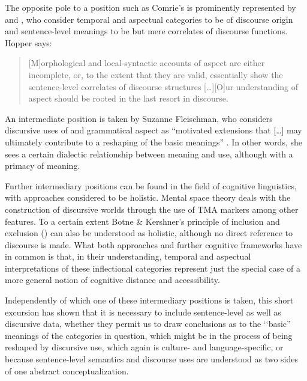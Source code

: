 The opposite pole to a position such as Comrie's is prominently represented by \citet{WeinreichH1964} and \citet{HopperP1982}, who consider temporal and aspectual categories to be of discourse origin and sentence-level meanings to be but mere correlates of discourse functions. Hopper says:
\begin{quote} {[M]orphological and local-syntactic accounts of aspect are either incomplete, or, to the extent that they are valid, essentially show the sentence-level correlates of discourse structures […][O]ur understanding of aspect should be rooted in the last resort in discourse. \citep[16]{HopperP1982}}\end{quote}

An intermediate position is taken by Suzanne Fleischman, who considers discursive uses of  and grammatical aspect as ``motivated extensions that […] may ultimately contribute to a reshaping of the basic meanings'' \citep[23]{FleischmanS1990}. In other words, she sees a certain dialectic relationship between meaning and use, although with a primacy of meaning.

Further intermediary positions can be found in the field of cognitive linguistics, with approaches considered to be holistic. Mental space theory \citep{FauconnierG1994} deals with the construction of discursive worlds through the use of TMA markers among other features. To a certain extent Botne \& Kershner's principle of inclusion and exclusion () can also be understood as holistic, although no direct reference to discourse is made. What both approaches and further cognitive frameworks have in common is that, in their understanding, temporal and aspectual interpretations of these inflectional categories represent just the special case of a more general notion of cognitive distance and accessibility.

Independently of which one of these intermediary positions is taken, this short excursion has shown that it is necessary to include sentence-level as well as discursive data, whether they permit us to draw conclusions as to the \lq\lq basic'' meanings of the categories in question, which might be in the process of being reshaped by discursive use, which again is culture- and language-specific, or because sentence-level semantics and discourse uses are understood as two sides of one abstract conceptualization.
